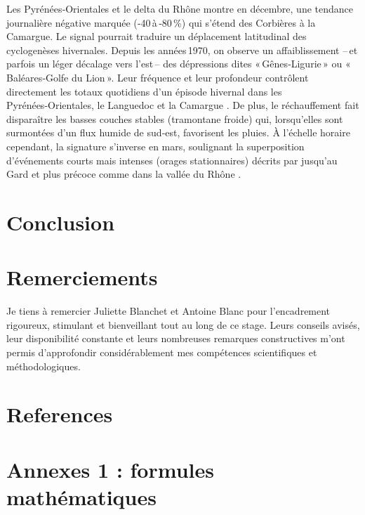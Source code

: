 \documentclass[
  article,
  nofooter,
  noheadings]{jss}
\begin{document}
Les Pyrénées‑Orientales et le delta du Rhône montre en décembre, une
tendance journalière négative marquée (‑40\,à\,‑80\,\%) qui s'étend des
Corbières à la Camargue. Le signal pourrait traduire un déplacement
latitudinal des cyclogenèses hivernales. Depuis les années\,1970, on
observe un affaiblissement --\,et parfois un léger décalage vers
l'est\,-- des dépressions dites «\,Gênes‑Ligurie\,» ou «\,Baléares‑Golfe
du Lion\,». Leur fréquence et leur profondeur contrôlent directement les
totaux quotidiens d'un épisode hivernal dans les Pyrénées‑Orientales, le
Languedoc et la Camargue \citep{Trigo2000}. De plus, le réchauffement
fait disparaître les basses couches stables (tramontane froide)
\citep{ObermannHellhund2018} qui, lorsqu'elles sont surmontées d'un flux
humide de sud‑est, favorisent les pluies. À l'échelle horaire cependant,
la signature s'inverse en mars, soulignant la superposition d'événements
courts mais intenses (orages stationnaires) décrits par
\citet{Berghald2025} jusqu'au Gard et plus précoce comme dans la vallée
du Rhône \citep{blanchet2021explaining}.

\section{Conclusion}\label{conclusion}

\section*{Remerciements}\label{remerciements}

Je tiens à remercier Juliette Blanchet et Antoine Blanc pour
l'encadrement rigoureux, stimulant et bienveillant tout au long de ce
stage. Leurs conseils avisés, leur disponibilité constante et leurs
nombreuses remarques constructives m'ont permis d'approfondir
considérablement mes compétences scientifiques et méthodologiques.

\section*{References}\label{references}

\renewcommand{\bibsection}{}


\newpage

\section*{Annexes 1 : formules
mathématiques}\label{annexes-1-formules-mathuxe9matiques}
\end{document}
